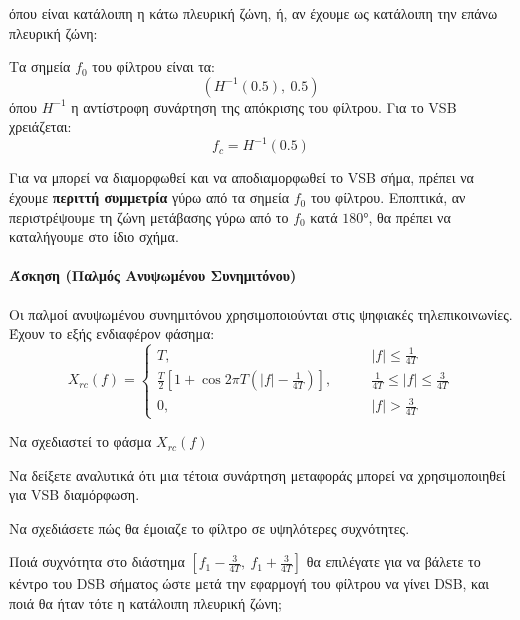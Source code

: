 \documentclass[11pt,a4paper,notitlepage,fleqn]{article}
\begin{document}
όπου είναι κατάλοιπη η κάτω πλευρική ζώνη, ή, αν έχουμε ως κατάλοιπη την επάνω πλευρική
ζώνη:


Τα σημεία \( f_0 \) του φίλτρου είναι τα:
\[
\left( H^{-1}(0.5), \ 0.5 \right)
\]
όπου \( H^{-1} \) η αντίστροφη συνάρτηση της απόκρισης του φίλτρου. Για το VSB χρειάζεται:
\[
f_c = H^{-1}(0.5)
\]

Για να μπορεί να διαμορφωθεί και να αποδιαμορφωθεί το VSB σήμα, πρέπει να έχουμε \textbf{περιττή συμμετρία} γύρω από τα σημεία \( f_0 \) του φίλτρου. Εποπτικά, αν περιστρέψουμε τη ζώνη μετάβασης γύρω από το \( f_0 \) κατά \( \ang{180} \), θα πρέπει
να καταλήγουμε στο ίδιο σχήμα.

\paragraph{Άσκηση (Παλμός Ανυψωμένου Συνημιτόνου)}
Οι παλμοί ανυψωμένου συνημιτόνου χρησιμοποιούνται στις ψηφιακές τηλεπικοινωνίες. Έχουν
το εξής ενδιαφέρον φάσημα:
\[
X_{rc}(f) = \begin{cases}
T, \qquad & |f| \leq \frac{1}{4T}\\
\frac{T}{2}\left[1+\cos2πT\left(|f|-\frac{1}{4T}\right)\right],\qquad & \frac{1}{4T} \leq |f| \leq \frac{3}{4T}\\
0,\qquad & |f| > \frac{3}{4T}
\end{cases}
\]

\begin{enumgreekparen}
	\item Να σχεδιαστεί το φάσμα \( X_{rc}(f) \)
	\item Να δείξετε αναλυτικά ότι μια τέτοια συνάρτηση μεταφοράς μπορεί να χρησιμοποιηθεί
	για VSB διαμόρφωση.
	\item Να σχεδιάσετε πώς θα έμοιαζε το φίλτρο σε υψηλότερες συχνότητες.
	\item Ποιά συχνότητα στο διάστημα \( \left[ f_1-\frac{3}{4T},\
	f_1+\frac{3}{4T} \right] \) θα επιλέγατε για να βάλετε το κέντρο του DSB σήματος
	ώστε μετά την εφαρμογή του φίλτρου να γίνει DSB, και ποιά θα ήταν τότε η κατάλοιπη πλευρική ζώνη;
\end{enumgreekparen}
\end{document}
